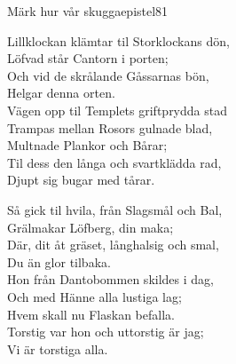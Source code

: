 \begin{song}{Märk hur vår skugga}{epistel81}
\begin{vers}
Lillklockan klämtar til Storklockans dön,\\
Löfvad står Cantorn i porten;\\
Och vid de skrålande Gåssarnas bön,\\
Helgar denna orten.\\
Vägen opp til Templets griftprydda stad\\
Trampas mellan Rosors gulnade blad,\\
Multnade Plankor och Bårar;\\
Til dess den långa och svartklädda rad,\\
Djupt sig bugar med tårar.\\
\end{vers}
\begin{vers}
Så gick til hvila, från Slagsmål och Bal,\\
Grälmakar Löfberg, din maka; \\
Där, dit åt gräset, långhalsig och smal,\\
Du än glor tilbaka.\\
Hon från Dantobommen skildes i dag,\\
Och med Hänne alla lustiga lag;\\ 
Hvem skall nu Flaskan befalla.\\
Torstig var hon och uttorstig är jag;\\ 
Vi är torstiga alla.\\
\end{vers}
\end{song}

\newpage



